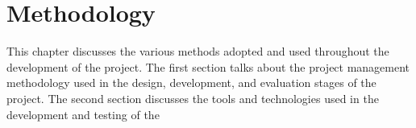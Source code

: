 \chapter{Methodology}

This chapter discusses the various methods adopted and used throughout the development of the project. 
The first section talks about the project management methodology used in the design, development, and evaluation
stages of the project. The second section discusses the tools and technologies used in the development and testing
of the 
